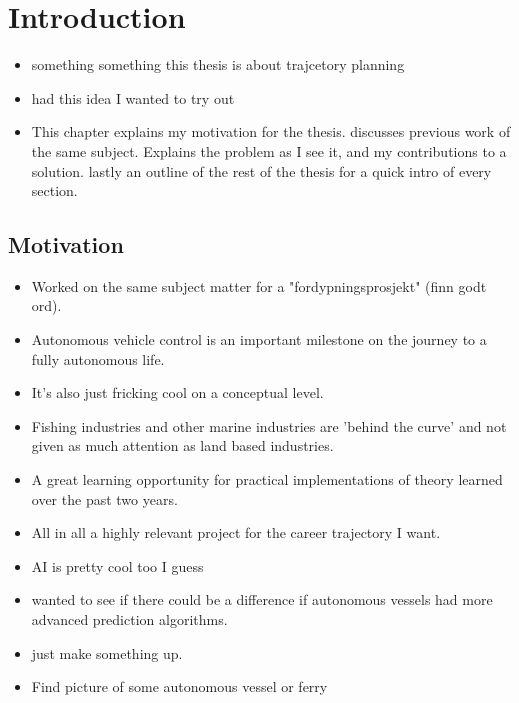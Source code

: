 \section{Introduction}
\begin{itemize}
    \item something something this thesis is about trajcetory planning
    \item had this idea I wanted to try out
    \item This chapter explains my motivation for the thesis. discusses previous work of the same subject.
    Explains the problem as I see it, and my contributions to a solution. lastly an outline of the rest of the thesis for a quick intro of every section.
\end{itemize}
\subsection{Motivation}
\begin{itemize}
    \item Worked on the same subject matter for a "fordypningsprosjekt" (finn godt ord).
    \item Autonomous vehicle control is an important milestone on the journey to a fully autonomous life.
    \item It's also just fricking cool on a conceptual level.
    \item Fishing industries and other marine industries are 'behind the curve' and not given as much attention as land based industries.
    \item A great learning opportunity for practical implementations of theory learned over the past two years.
    \item All in all a highly relevant project for the career trajectory I want.
    \item AI is pretty cool too I guess
    \item wanted to see if there could be a difference if autonomous vessels had more advanced prediction algorithms.
    \item just make something up.
    \item Find picture of some autonomous vessel or ferry
\end{itemize}

